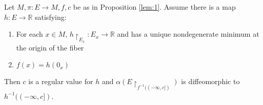 \begin{prop}

Let $M, \pi:E \to M, f, c$ be as in Proposition \ref{lem:1}. Assume there is a map $h:E \to \mathbb{R}$ satisfying:
\begin{enumerate}
    \item For each $x \in M$, $h \restriction_{E_x}: E_x \to \mathbb{R}$ and has a unique nondegenerate minimum at the origin of the fiber
    \item $f(x) = h(0_x)$
\end{enumerate}
\indent Then $c$ is a regular value for $h$ and $\alpha( E \restriction_{f^{-1}((-\infty,c])})$ is diffeomorphic to $h^{-1}((-\infty,c])$.
\end{prop}
